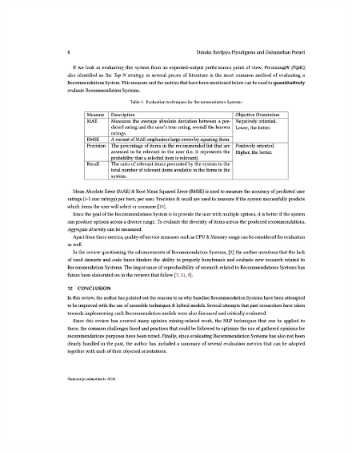 \begin{figure}[h!]
\centering
\includegraphics[width=\textwidth]{images/appendix/papers/review/A Review on Pushing the Limits of Baseline Recommendation Systems with the integration of Opinion Mining & Information Retrieval Techniques 8.jpeg}
\end{figure}

